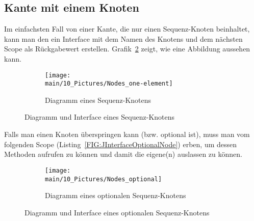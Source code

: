 \documentclass[../InterneDSLs.tex]{subfiles}
\begin{document}
\begin{figure}[ht]

\end{figure}

\subsection{Kante mit einem Knoten}
Im einfachsten Fall von einer Kante, die nur einen Sequenz-Knoten beinhaltet, kann man den ein Interface mit dem Namen des Knotens und dem nächsten Scope als Rückgabewert erstellen. Grafik~\ref{FIG:OneElementNode} zeigt, wie eine Abbildung aussehen kann.
\begin{figure}[ht]
\centering
  \begin{subfigure}[c]{0.49\textwidth}
    \texttt{[image: \\main/10\_Pictures/Nodes\_one-element]}
    \caption{Diagramm eines Sequenz-Knotens}
    \label{FIG:DiagramOneElementNode}
  \end{subfigure}
  \begin{subfigure}[c]{0.49\textwidth}
    
  \end{subfigure}
  \caption{Diagramm und Interface eines Sequenz-Knotens}
  \label{FIG:OneElementNode}
\end{figure}

Falls man einen Knoten überspringen kann (bzw. optional ist), muss man vom folgenden Scope (Listing~\ref{FIG:JInterfaceOptionalNode}) erben, um dessen Methoden aufrufen zu können und damit die eigene(n) auslassen zu können.
\begin{figure}[ht]
\centering
  \begin{subfigure}[c]{0.49\textwidth}
    \texttt{[image: \\main/10\_Pictures/Nodes\_optional]}
    \caption{Diagramm eines optionalen Sequenz-Knotens}
    \label{FIG:DiagramOptionalNode}
  \end{subfigure}
  \begin{subfigure}[c]{0.49\textwidth}
    
  \end{subfigure}
  \caption{Diagramm und Interface eines optionalen Sequenz-Knotens}
  \label{FIG:OptionalNode}
\end{figure}
\end{document}
